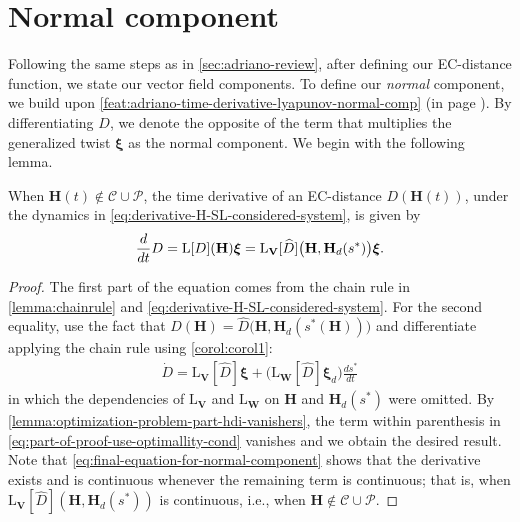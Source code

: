 \section{Normal component}
Following the same steps as in \cref{sec:adriano-review}, after defining our EC-distance function, we state our vector field components. To define our \emph{normal} component, we build upon \cref{feat:adriano-time-derivative-lyapunov-normal-comp} (in page \pageref{feat:adriano-time-derivative-lyapunov-normal-comp}). By differentiating $D$, we denote the opposite of the term that multiplies the generalized twist $\boldsymbol{\xi}$ as the normal component. We begin with the following lemma.
\begin{lemma}\label{lemma:time-derivative-of-distance-function}
    When $\mathbf{H}(t) \not \in \mathcal{C} \cup \mathcal{P}$, the time derivative of an EC-distance $D(\mathbf{H}(t))$, under the dynamics in \eqref{eq:derivative-H-SL-considered-system}, is given by 
    \begin{align}
        \frac{d}{dt}{D} = \textnormal{L}[D](\mathbf{H})\boldsymbol{\xi} =  \textnormal{L}_{\mathbf{V}}[\widehat{D}]\bigl(\mathbf{H},\mathbf{H}_d(s^*)\bigr)\boldsymbol{\xi}. \label{eq:final-equation-for-normal-component}
    \end{align}
\end{lemma}
\begin{proof}
The first part of the equation comes from the chain rule in \cref{lemma:chainrule} and \eqref{eq:derivative-H-SL-considered-system}. For the second equality, use the fact that $D(\mathbf{H}) = \widehat{D}\bigl(\mathbf{H},\mathbf{H}_d(s^*(\mathbf{H}))\bigr)$ and differentiate applying the chain rule using \cref{corol:corol1}:
    \begin{align}
    \dot{D} = \text{L}_{\mathbf{V}}[\widehat{D}]\boldsymbol{\xi} + \bigg(\text{L}_{\mathbf{W}}[\widehat{D}] \boldsymbol{\xi}_d\bigg) \frac{ds^*}{dt} \label{eq:part-of-proof-use-optimallity-cond}
\end{align}
in which the dependencies of $\text{L}_{\mathbf{V}}$ and $\text{L}_{\mathbf{W}}$ on $\mathbf{H}$ and $\mathbf{H}_d(s^*)$ were omitted. By \cref{lemma:optimization-problem-part-hdi-vanishers}, the term within parenthesis in \eqref{eq:part-of-proof-use-optimallity-cond} vanishes and we obtain the desired result. Note that \eqref{eq:final-equation-for-normal-component} shows that the derivative exists and is continuous whenever the remaining term is continuous; that is, when $\text{L}_{\mathbf{V}}[\widehat{D}](\mathbf{H},\mathbf{H}_d(s^*))$ is continuous, i.e., when $\mathbf{H} \not \in \mathcal{C} \cup \mathcal{P}$. 
\end{proof}

